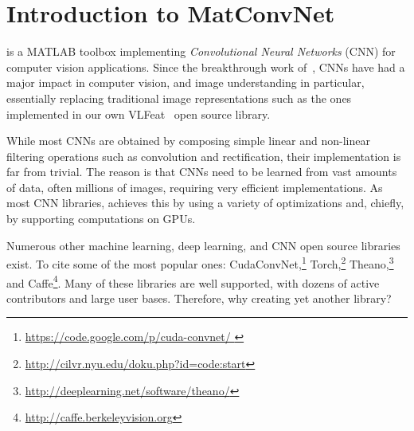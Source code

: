 \chapter{Introduction to MatConvNet}\label{s:intro}

\matconvnet is a MATLAB toolbox implementing \emph{Convolutional Neural Networks} (CNN) for computer vision applications.  Since the breakthrough work of~\cite{krizhevsky12imagenet}, CNNs have had a major impact in computer vision, and image understanding in particular, essentially replacing traditional image representations such as the ones implemented in our own VLFeat~\cite{vedaldi10vlfeat} open source library.

While most CNNs are  obtained by composing simple linear and non-linear filtering operations such as convolution and rectification, their implementation is far from trivial. The reason is that CNNs need to be learned from vast amounts of data, often millions of images, requiring very efficient implementations. As most CNN libraries, \matconvnet achieves this by using a variety of optimizations and, chiefly, by supporting computations on GPUs.

Numerous other machine learning, deep learning, and CNN open source libraries exist. To cite some of the most popular ones: CudaConvNet,\footnote{\small\url{https://code.google.com/p/cuda-convnet/ }} Torch,\footnote{\small\url{http://cilvr.nyu.edu/doku.php?id=code:start}} Theano,\footnote{\small\url{http://deeplearning.net/software/theano/}} and Caffe\footnote{\small\url{http://caffe.berkeleyvision.org}}.  Many of these libraries are  well supported, with dozens of active contributors and large user bases. Therefore, why creating yet another library?

